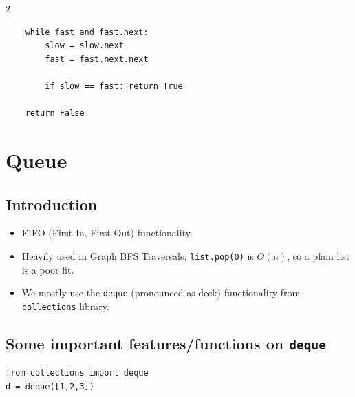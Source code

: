 \documentclass[9pt,a4paper]{extarticle}
\begin{document}
\begin{multicols}{2}
\begin{lstlisting}
    while fast and fast.next:
        slow = slow.next
        fast = fast.next.next

        if slow == fast: return True

    return False
\end{lstlisting}

\section{Queue}

\subsection{Introduction}

\begin{itemize}
\item FIFO (First In, First Out) functionality
\item Heavily used in Graph BFS Traversals. \texttt{list.\allowbreak{}pop(\allowbreak{}0)} is $O(n)$, so a plain list is a poor fit.
\item We mostly use the \texttt{deque} (pronounced as deck) functionality from \texttt{collections} library.
\end{itemize}

\subsection{Some important features/functions on \texorpdfstring{\texttt{deque}}{deque}}

\begin{lstlisting}
from collections import deque
d = deque([1,2,3])
\end{lstlisting}


\end{multicols}
\end{document}
